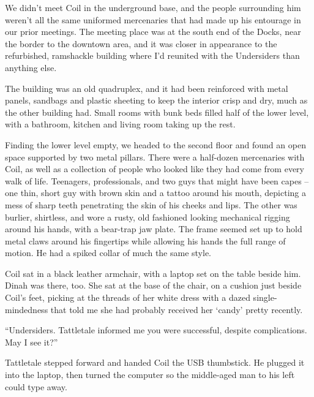 \sectionbreak



We didn't meet Coil in the underground base, and the people surrounding him weren't all the same uniformed mercenaries that had made up his entourage in our prior meetings.  The meeting place was at the south end of the Docks, near the border to the downtown area, and it was closer in appearance to the refurbished, ramshackle building where I'd reunited with the Undersiders than anything else.



The building was an old quadruplex, and it had been reinforced with metal panels, sandbags and plastic sheeting to keep the interior crisp and dry, much as the other building had.  Small rooms with bunk beds filled half of the lower level, with a bathroom, kitchen and living room taking up the rest.



Finding the lower level empty, we headed to the second floor and found an open space supported by two metal pillars.  There were a half-dozen mercenaries with Coil, as well as a collection of people who looked like they had come from every walk of life.  Teenagers, professionals, and two guys that might have been capes – one thin, short guy with brown skin and a tattoo around his mouth, depicting a mess of sharp teeth penetrating the skin of his cheeks and lips.  The other was burlier, shirtless, and wore a rusty, old fashioned looking mechanical rigging around his hands, with a bear-trap jaw plate.  The frame seemed set up to hold metal claws around his fingertips while allowing his hands the full range of motion.   He had a spiked collar of much the same style.



Coil sat in a black leather armchair, with a laptop set on the table beside him.  Dinah was there, too.  She sat at the base of the chair, on a cushion just beside Coil's feet, picking at the threads of her white dress with a dazed single-mindedness that told me she had probably received her `candy' pretty recently.



``Undersiders.  Tattletale informed me you were successful, despite complications.  May I see it?''



Tattletale stepped forward and handed Coil the USB thumbstick.  He plugged it into the laptop, then turned the computer so the middle-aged man to his left could type away.




